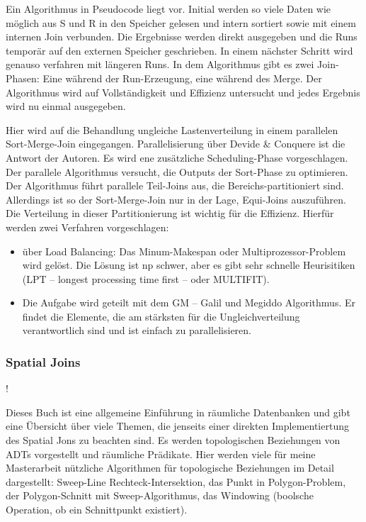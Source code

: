 \documentclass[a4paper,12pt,twoside]{article}
\begin{document}
Ein Algorithmus in Pseudocode liegt vor. Initial werden so viele Daten wie möglich aus S und R in den Speicher gelesen und intern sortiert sowie mit einem internen Join verbunden. Die Ergebnisse werden direkt ausgegeben und die Runs temporär auf den externen Speicher geschrieben. In einem nächster Schritt wird genauso verfahren mit längeren Runs. In dem Algorithmus gibt es zwei Join-Phasen: Eine während der Run-Erzeugung, eine während des Merge. Der Algorithmus wird auf Vollständigkeit und Effizienz untersucht und jedes Ergebnis wird nu einmal ausgegeben. 

\textbf{}

Hier wird auf die Behandlung ungleiche Lastenverteilung in einem parallelen Sort-Merge-Join eingegangen. Parallelisierung über Devide \& Conquere ist die Antwort der Autoren. Es wird ene zusätzliche Scheduling-Phase vorgeschlagen. Der parallele Algorithmus versucht, die Outputs der Sort-Phase zu optimieren. Der Algorithmus führt parallele Teil-Joins aus, die Bereichs-partitioniert sind. Allerdings ist so der Sort-Merge-Join nur in der Lage, Equi-Joins auszuführen. Die Verteilung in dieser Partitionierung ist wichtig für die Effizienz. Hierfür werden zwei Verfahren vorgeschlagen: 

\begin{itemize}
	\item über Load Balancing: Das Minum-Makespan oder Multiprozessor-Problem wird gelöst. Die Lösung ist np schwer, aber es gibt sehr schnelle Heurisitiken (LPT -- longest processing time first -- oder MULTIFIT).
	\item Die Aufgabe wird geteilt mit dem GM -- Galil und Megiddo Algorithmus. Er findet die Elemente, die am stärksten für die Ungleichverteilung verantwortlich sind und ist einfach zu parallelisieren.
\end{itemize}

\subsubsection{Spatial Joins}

\textbf{}!

Dieses Buch ist eine allgemeine Einführung in räumliche Datenbanken und gibt eine Übersicht über viele Themen, die jenseits einer direkten Implementiertung des Spatial Jons zu beachten sind. Es werden topologischen Beziehungen von ADTs vorgestellt und räumliche Prädikate. Hier werden viele für meine Masterarbeit nützliche Algorithmen für topologische Beziehungen im Detail dargestellt: Sweep-Line Rechteck-Intersektion, das Punkt in Polygon-Problem, der Polygon-Schnitt mit Sweep-Algorithmus, das Windowing (boolsche Operation, ob ein Schnittpunkt existiert).
\end{document}
